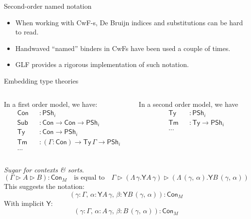 \documentclass[dvipsnames,aspectratio=169]{beamer}
\newcommand{\Con}{\mathsf{Con}}
\newcommand{\Sub}{\mathsf{Sub}}
\newcommand{\Tm}{\mathsf{Tm}}
\newcommand{\Ty}{\mathsf{Ty}}
\newcommand{\Y}{\mathsf{Y}}
\newcommand{\PSh}{\mathsf{PSh}}
\newcommand{\ext}{\triangleright}
\begin{document}
\begin{frame}{Second-order named notation}
  \begin{itemize}
  \item When working with CwF-s, De Bruijn indices and substitutions
        can be hard to read.
  \item Handwaved ``named'' binders in CwFs have been used a couple of times.
  \item GLF provides a rigorous implementation of such notation.
  \end{itemize}
\end{frame}

\begin{frame}{Embedding type theories}

\begin{columns}
\begin{column}{0.5\textwidth}
In a first order model, we have:
\begin{alignat*}{3}
  &\Con &&: \PSh_i \\
  &\Sub &&: \Con \to \Con \to \PSh_i \\
  &\Ty  &&: \Con \to \PSh_i \\
  &\Tm  &&: (\Gamma : \Con) \to \Ty\,\Gamma \to \PSh_i \\
  & ... &&
\end{alignat*}
\end{column}
\begin{column}{0.5\textwidth}
In a second order model, we have
\begin{alignat*}{3}
  &\Ty  &&: \PSh_i \\
  &\Tm  &&: \Ty \to \PSh_i \\
  & ... && \\
  & && \\
  & &&
\end{alignat*}
\end{column}
\end{columns}
\vspace{0.5em}
\pause

\emph{Sugar for contexts \& sorts}.
\[(\Gamma \ext A \ext B) : \Con_M \quad \text{is equal to}\quad  \Gamma \ext (\Lambda\,\gamma. \Y A\,\gamma) \ext (\Lambda\,(\gamma,\,\alpha). \Y B\,(\gamma,\,\alpha)) \]
\pause
This suggests the notation:
\[(\gamma : \Gamma,\,\alpha : \Y A\,\gamma,\,\beta : \Y B\,(\gamma,\,\alpha)) : \Con_M\]
With implicit $\Y$:
\[(\gamma : \Gamma,\,\alpha : A\,\gamma,\,\beta : B\,(\gamma,\,\alpha)) : \Con_M\]

\end{frame}
\end{document}
